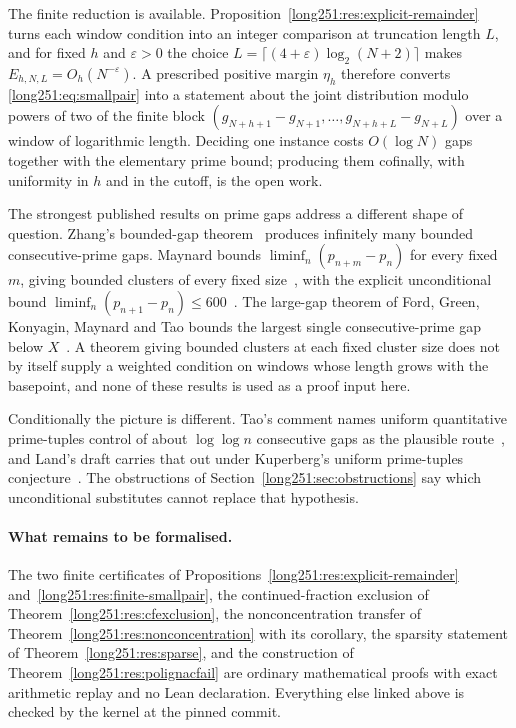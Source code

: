 The finite reduction is available.  Proposition~\ref{long251:res:explicit-remainder}
turns each window condition into an integer comparison at truncation length
$L$, and for fixed $h$ and $\varepsilon>0$ the choice
$L=\lceil(4+\varepsilon)\log_2(N+2)\rceil$ makes $E_{h,N,L}=O_h(N^{-\varepsilon})$.
A prescribed positive margin $\eta_h$ therefore converts \eqref{long251:eq:smallpair}
into a statement about the joint distribution modulo powers of two of the
finite block $(g_{N+h+1}-g_{N+1},\ldots,g_{N+h+L}-g_{N+L})$ over a window of
logarithmic length.  Deciding one instance costs $O(\log N)$ gaps together with
the elementary prime bound; producing them cofinally, with uniformity in $h$
and in the cutoff, is the open work.

The strongest published results on prime gaps address a different shape of
question.  Zhang's bounded-gap theorem~\cite[Theorem~1, p.~1122]{zhang2014}
produces infinitely many bounded consecutive-prime gaps.  Maynard bounds
$\liminf_n(p_{n+m}-p_n)$ for every fixed $m$, giving bounded clusters of every
fixed size~\cite[Theorem~1.1, p.~384]{maynard2015}, with the explicit
unconditional bound $\liminf_n(p_{n+1}-p_n)\le600$~\cite[Theorem~1.3,
p.~385]{maynard2015}.  The large-gap theorem of Ford, Green, Konyagin, Maynard
and Tao bounds the largest single consecutive-prime gap below
$X$~\cite[Theorem~1, p.~66]{fgkmt2018}.  A theorem giving bounded clusters at
each fixed cluster size does not by itself supply a weighted condition on
windows whose length grows with the basepoint, and none of these results is
used as a proof input here.

Conditionally the picture is different.  Tao's comment names uniform
quantitative prime-tuples control of about $\log\log n$ consecutive gaps as the
plausible route~\cite[comment of 7 October 2025]{erdosproblems251thread}, and
Land's draft carries that out under Kuperberg's uniform prime-tuples
conjecture~\cite{land2026}.  The obstructions of
Section~\ref{long251:sec:obstructions} say which unconditional substitutes cannot
replace that hypothesis.

\paragraph{What remains to be formalised.}
The two finite certificates of
Propositions~\ref{long251:res:explicit-remainder} and~\ref{long251:res:finite-smallpair}, the
continued-fraction exclusion of Theorem~\ref{long251:res:cfexclusion}, the
nonconcentration transfer of Theorem~\ref{long251:res:nonconcentration} with its
corollary, the sparsity statement of Theorem~\ref{long251:res:sparse}, and the
construction of Theorem~\ref{long251:res:polignacfail} are ordinary mathematical proofs
with exact arithmetic replay and no Lean declaration.  Everything else linked
above is checked by the kernel at the pinned commit.

